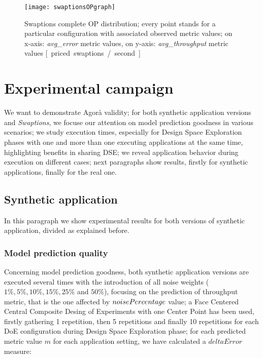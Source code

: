 \begin{figure}[h]

    \centering
    \texttt{[image: swaptionsOPgraph]}
    \caption[Swaptions complete OP distribution]{Swaptions complete OP distribution; every point stands for a particular configuration with associated observed metric values; on x-axis: \textit{avg\_error} metric values, on y-axis: \textit{avg\_throughput} metric values \hbox{[ priced swaptions / second ]}}
    \label{fig::swaptionsOPs}
    
\end{figure}





\section{Experimental campaign}\label{campaign}

We want to demonstrate Agorà validity; for both synthetic application versions and \textit{Swaptions}, we focuse our attention on model prediction goodness in various scenarios; we study execution times, especially for Design Space Exploration phases with one and more than one executing applications at the same time, highlighting benefits in sharing DSE; we reveal application behavior during execution on different cases; next paragraphs show results, firstly for synthetic applications, finally for the real one.


\subsection{Synthetic application}

In this paragraph we show experimental results for both versions of synthetic application, divided as explained before.


\subsubsection{Model prediction quality}\label{deltaErrorExplanation}

Concerning model prediction goodness, both synthetic application versions are executed several times with the introduction of all noise weights ($1\%, 5\%, 10\%, 15\%, 25\%$ and $50\%$), focusing on the prediction of throughput metric, that is the one affected by $noise\-Percentage$ value; a Face Centered Central Composite Desing of Experiments with one Center Point has been used, firstly gathering 1 repetition, then 5 repetitions and finally 10 repetitions for each DoE configuration during Design Space Exploration phase; for each predicted metric value $m$ for each application setting, we have calculated a $deltaError$ measure:

